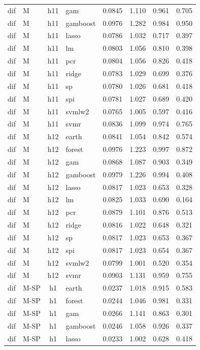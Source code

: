 \begin{ThreePartTable}
\begin{longtable}[t]{llclcccc}
dif & M & h11 & gam & 0.0845 & 1.110 & 0.961 & 0.705\\
dif & M & h11 & gamboost & 0.0976 & 1.282 & 0.984 & 0.950\\
dif & M & h11 & lasso & 0.0786 & 1.032 & 0.717 & 0.397\\
dif & M & h11 & lm & 0.0803 & 1.056 & 0.810 & 0.398\\
dif & M & h11 & pcr & 0.0804 & 1.056 & 0.826 & 0.418\\
dif & M & h11 & ridge & 0.0783 & 1.029 & 0.699 & 0.376\\
dif & M & h11 & sp & 0.0780 & 1.026 & 0.681 & 0.418\\
dif & M & h11 & spi & 0.0781 & 1.027 & 0.689 & 0.420\\
dif & M & h11 & svmlw2 & 0.0765 & 1.005 & 0.597 & 0.416\\
dif & M & h11 & svmr & 0.0836 & 1.099 & 0.974 & 0.765\\
\addlinespace
dif & M & h12 & earth & 0.0841 & 1.054 & 0.842 & 0.574\\
dif & M & h12 & forest & 0.0976 & 1.223 & 0.997 & 0.872\\
dif & M & h12 & gam & 0.0868 & 1.087 & 0.903 & 0.349\\
dif & M & h12 & gamboost & 0.0979 & 1.226 & 0.994 & 0.408\\
dif & M & h12 & lasso & 0.0817 & 1.023 & 0.653 & 0.328\\
dif & M & h12 & lm & 0.0825 & 1.033 & 0.690 & 0.164\\
dif & M & h12 & pcr & 0.0879 & 1.101 & 0.876 & 0.513\\
dif & M & h12 & ridge & 0.0816 & 1.022 & 0.648 & 0.321\\
dif & M & h12 & sp & 0.0817 & 1.023 & 0.653 & 0.367\\
dif & M & h12 & spi & 0.0817 & 1.023 & 0.654 & 0.367\\
dif & M & h12 & svmlw2 & 0.0799 & 1.001 & 0.520 & 0.354\\
dif & M & h12 & svmr & 0.0903 & 1.131 & 0.959 & 0.755\\
\addlinespace
dif & M-SP & h1 & earth & 0.0237 & 1.018 & 0.915 & 0.583\\
dif & M-SP & h1 & forest & 0.0244 & 1.046 & 0.981 & 0.331\\
dif & M-SP & h1 & gam & 0.0266 & 1.141 & 0.863 & 0.301\\
dif & M-SP & h1 & gamboost & 0.0246 & 1.058 & 0.926 & 0.337\\
dif & M-SP & h1 & lasso & 0.0233 & 1.002 & 0.628 & 0.418\\

\end{longtable}
\end{ThreePartTable}
